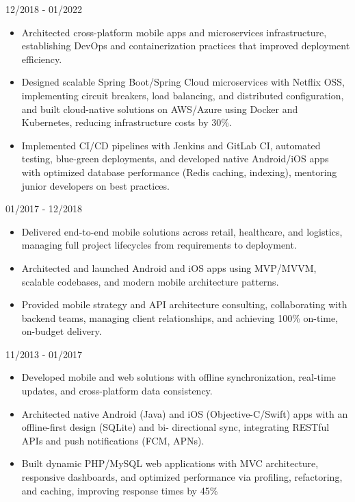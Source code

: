 \documentclass{mycv}
\begin{document}
{12/2018 - 01/2022}

\begin{itemize}
    \item Architected cross-platform mobile apps and microservices infrastructure, establishing DevOps and containerization
practices that improved deployment efficiency.
    \item Designed scalable Spring Boot/Spring Cloud microservices with Netflix OSS, implementing circuit breakers, load
balancing, and distributed configuration, and built cloud-native solutions on AWS/Azure using Docker and Kubernetes,
reducing infrastructure costs by 30\%.
    \item Implemented CI/CD pipelines with Jenkins and GitLab CI, automated testing, blue-green deployments, and developed
native Android/iOS apps with optimized database performance (Redis caching, indexing), mentoring junior developers
on best practices.
\end{itemize}

{01/2017 - 12/2018}

\begin{itemize}
    \item Delivered end-to-end mobile solutions across retail, healthcare, and logistics, managing full project lifecycles from
requirements to deployment.
    \item Architected and launched Android and iOS apps using MVP/MVVM, scalable codebases, and modern mobile
architecture patterns.
    \item Provided mobile strategy and API architecture consulting, collaborating with backend teams, managing client
relationships, and achieving 100\% on-time, on-budget delivery.
\end{itemize}

{11/2013 - 01/2017}

\begin{itemize}
    \item Developed mobile and web solutions with offline synchronization, real-time updates, and cross-platform data
consistency.
    \item Architected native Android (Java) and iOS (Objective-C/Swift) apps with an offline-first design (SQLite) and bi-
directional sync, integrating RESTful APIs and push notifications (FCM, APNs).
    \item Built dynamic PHP/MySQL web applications with MVC architecture, responsive dashboards, and optimized performance
via profiling, refactoring, and caching, improving response times by 45\%
\end{itemize}
\end{document}
